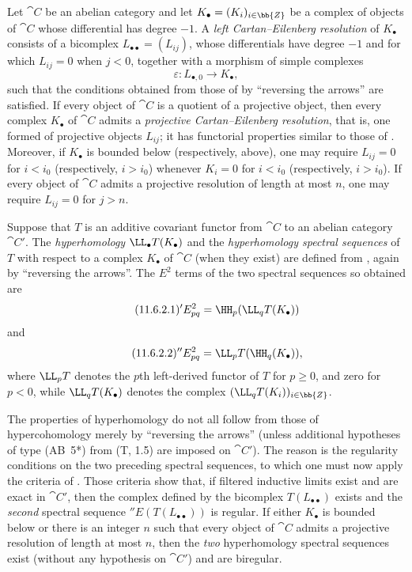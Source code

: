 \begin{env}[11.6.1]
\label{0.11.6.1}
Let $\cat{C}$ be an abelian category and let $K_\bullet=(K_i)_{i\in\bb{Z}}$ be a complex of objects of $\cat{C}$ whose differential has degree $-1$.
A \emph{left Cartan--Eilenberg resolution} of $K_\bullet$ consists of a bicomplex $L_{\bullet\bullet}=(L_{ij})$, whose differentials have degree $-1$ and for which $L_{ij}=0$ when $j<0$, together with a morphism of simple complexes
\[
  \varepsilon:L_{\bullet,0}\longrightarrow K_\bullet,
\]
such that the conditions obtained from those of  by ``reversing the arrows'' are satisfied.
If every object of $\cat{C}$ is a quotient of a projective object, then every complex $K_\bullet$ of $\cat{C}$ admits a \emph{projective Cartan--Eilenberg resolution}, that is, one formed of projective objects $L_{ij}$; it has functorial properties similar to those of .
Moreover, if $K_\bullet$ is bounded below (respectively, above), one may require $L_{ij}=0$ for $i<i_0$ (respectively, $i>i_0$) whenever $K_i=0$ for $i<i_0$ (respectively, $i>i_0$).
If every object of $\cat{C}$ admits a projective resolution of length at most $n$, one may require $L_{ij}=0$ for $j>n$.
\end{env}

\begin{env}[11.6.2]
\label{0.11.6.2}
Suppose that $T$ is an additive covariant functor from $\cat{C}$ to an abelian category $\cat{C}'$.
The \emph{hyperhomology} $\LL_\bullet T(K_\bullet)$ and the \emph{hyperhomology spectral sequences} of $T$ with respect to a complex $K_\bullet$ of $\cat{C}$ (when they exist) are defined from , again by ``reversing the arrows''.
The $E^2$ terms of the two spectral sequences so obtained are
\[
\label{0.11.6.2.1}
\tag{11.6.2.1}
  {}'E^2_{pq}
  =\HH_p(\LL_qT(K_\bullet))
\]
and
\[
\label{0.11.6.2.2}
\tag{11.6.2.2}
  {}''E^2_{pq}
  =\LL_pT(\HH_q(K_\bullet)),
\]
where $\LL_pT$ denotes the $p$th left-derived functor of $T$ for $p\geq0$, and zero for $p<0$, while $\LL_qT(K_\bullet)$ denotes the complex $(\LL_qT(K_i))_{i\in\bb{Z}}$.

The properties of hyperhomology do not all follow from those of hypercohomology merely by ``reversing the arrows'' (unless additional hypotheses of type (AB~5*) from (T, 1.5) are imposed on $\cat{C}'$).
The reason is the regularity conditions on the two preceding spectral sequences, to which one must now apply the criteria of .
Those criteria show that, if filtered inductive limits exist and are exact in $\cat{C}'$, then the complex defined by the bicomplex $T(L_{\bullet\bullet})$ exists and the \emph{second} spectral sequence ${}''E(T(L_{\bullet\bullet}))$ is regular.
If either $K_\bullet$ is bounded below or there is an integer $n$ such that every object of $\cat{C}$ admits a projective resolution of length at most $n$, then the \emph{two} hyperhomology spectral sequences exist (without any hypothesis on $\cat{C}'$) and are biregular.
\end{env}


